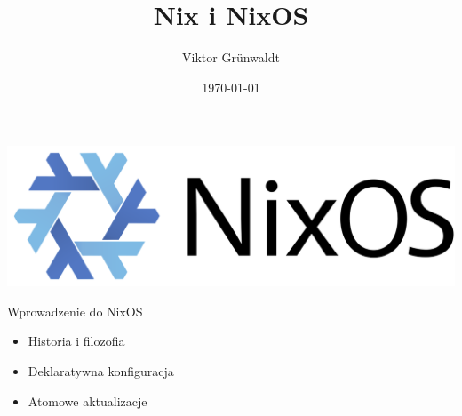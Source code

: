 \documentclass{beamer}
\title{Nix i NixOS}
\author{Viktor Grünwaldt}
\date{\today}
\begin{document}
\begin{frame}
    \titlepage
\end{frame}

\begin{frame}
    \includegraphics[width=0.75\linewidth]{./assets/NixOS_logo.png}
\end{frame}

\begin{frame}{Wprowadzenie do NixOS}
    \begin{itemize}
        \item Historia i filozofia
        \item Deklaratywna konfiguracja
        \item Atomowe aktualizacje
    \end{itemize}
\end{frame}
\end{document}
